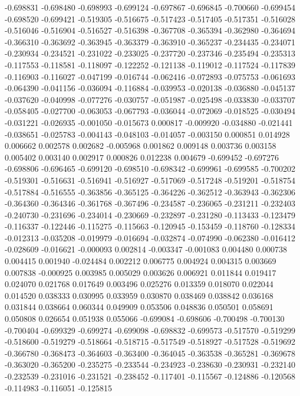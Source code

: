 -0.698831
-0.698480
-0.698993
-0.699124
-0.697867
-0.696845
-0.700660
-0.699454
-0.698520
-0.699421
-0.519305
-0.516675
-0.517423
-0.517405
-0.517351
-0.516028
-0.516046
-0.516904
-0.516527
-0.516398
-0.367708
-0.365394
-0.362980
-0.364694
-0.366310
-0.363692
-0.363945
-0.363379
-0.363910
-0.365237
-0.234435
-0.234071
-0.230934
-0.234521
-0.231022
-0.233025
-0.237720
-0.237346
-0.235494
-0.235313
-0.117553
-0.118581
-0.118097
-0.122252
-0.121138
-0.119012
-0.117524
-0.117839
-0.116903
-0.116027
-0.047199
-0.016744
-0.062416
-0.072893
-0.075753
-0.061693
-0.064390
-0.041156
-0.036094
-0.116884
-0.039953
-0.020138
-0.036880
-0.045137
-0.037620
-0.040998
-0.077276
-0.030757
-0.051987
-0.025498
-0.033830
-0.033707
-0.058405
-0.027700
-0.063053
-0.067793
-0.036044
-0.072069
-0.018525
-0.030494
-0.031221
-0.026935
-0.001050
-0.015673
0.000817
-0.009920
-0.034880
-0.021441
-0.038651
-0.025783
-0.004143
-0.048103
-0.014057
-0.003150
0.000851
0.014928
0.006662
0.002578
0.002682
-0.005968
0.001862
0.009148
0.003736
0.003158
0.005402
0.003140
0.002917
0.000826
0.012238
0.004679
-0.699452
-0.697276
-0.698806
-0.696465
-0.699120
-0.698510
-0.698342
-0.699961
-0.699585
-0.700202
-0.519301
-0.516631
-0.516941
-0.516927
-0.517069
-0.517248
-0.519201
-0.518754
-0.517884
-0.516555
-0.363856
-0.365125
-0.364226
-0.362512
-0.363943
-0.362306
-0.364360
-0.364346
-0.361768
-0.367496
-0.234587
-0.236065
-0.231211
-0.232403
-0.240730
-0.231696
-0.234014
-0.230669
-0.232897
-0.231280
-0.113433
-0.123479
-0.116337
-0.122446
-0.115275
-0.115663
-0.120945
-0.153459
-0.118760
-0.128334
-0.012313
-0.035208
-0.019979
-0.016694
-0.032874
-0.074990
-0.062380
-0.016412
-0.028609
-0.016621
-0.000093
0.002814
-0.003347
-0.001083
0.004480
0.000738
0.004415
0.001940
-0.024484
0.002212
0.006775
0.004924
0.004315
0.003669
0.007838
-0.000925
0.003985
0.005029
0.003626
0.006921
0.011844
0.019417
0.024070
0.021768
0.017649
0.003496
0.025276
0.013359
0.018070
0.022044
0.014520
0.038333
0.030995
0.033959
0.030870
0.038469
0.038842
0.036168
0.031844
0.038664
0.060344
0.049909
0.053506
0.048836
0.050501
0.058691
0.050808
0.026654
0.051938
0.055066
-0.699084
-0.698606
-0.700498
-0.700130
-0.700404
-0.699329
-0.699274
-0.699098
-0.698832
-0.699573
-0.517570
-0.519299
-0.518600
-0.519279
-0.518664
-0.518715
-0.517549
-0.518927
-0.517528
-0.519692
-0.366780
-0.368473
-0.364603
-0.363400
-0.364045
-0.363538
-0.365281
-0.369678
-0.363020
-0.365200
-0.235275
-0.233544
-0.234923
-0.238630
-0.230931
-0.232140
-0.232539
-0.231016
-0.231521
-0.238452
-0.117401
-0.115567
-0.124886
-0.120568
-0.114983
-0.116051
-0.125815
